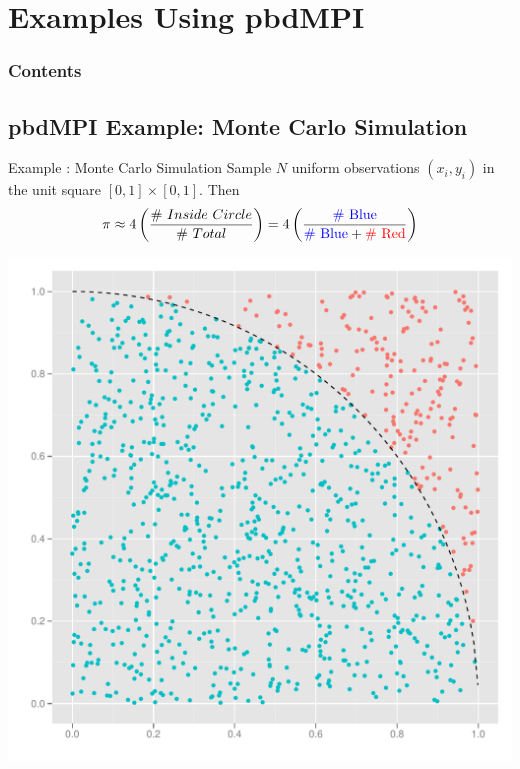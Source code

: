 \section[pbdMPI eg's]{Examples Using pbdMPI}

\hidenum
\begin{frame}[noframenumbering]
\frametitle{Contents}
 \tableofcontents[currentsection,hideothersubsections,sectionstyle=show/hide]
\end{frame}
\shownum


\subsection{pbdMPI Example: Monte Carlo Simulation}

\begin{frame}[shrink]
  \begin{block}{Example \countex :  Monte Carlo Simulation}\pause
  Sample $N$ uniform observations $(x_i, y_i)$ in the unit square $[0, 1]\times [0,1]$.  Then
\begin{equation*}
\pi \approx 4\left(\frac{\#\ Inside\ Circle}{\#\ Total}\right) = 4\left(\frac{\text{\color{blue}{\# Blue}}}{\text{\color{blue}{\# Blue}}+\text{\color{red}{\# Red}}}\right)
\label{eqn:pi}
\end{equation*}
  \begin{center}
   \includegraphics[scale=.25]{pics/pi} 
  \end{center}
  \end{block}
\end{frame}


